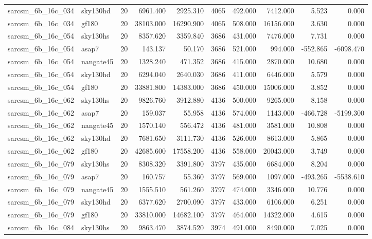 \begin{longtable}{llrrrrrrrr}
sarcsm\_6b\_16c\_034 & sky130hd & 20 & 6961.400 & 2925.310 & 4065 & 492.000 & 7412.000 & 5.523 & 0.000 \\
sarcsm\_6b\_16c\_034 & gf180 & 20 & 38103.000 & 16290.900 & 4065 & 508.000 & 16156.000 & 3.630 & 0.000 \\
sarcsm\_6b\_16c\_054 & sky130hs & 20 & 8357.620 & 3359.840 & 3686 & 431.000 & 7476.000 & 7.731 & 0.000 \\
sarcsm\_6b\_16c\_054 & asap7 & 20 & 143.137 & 50.170 & 3686 & 521.000 & 994.000 & -552.865 & -6098.470 \\
sarcsm\_6b\_16c\_054 & nangate45 & 20 & 1328.240 & 471.352 & 3686 & 415.000 & 2870.000 & 10.680 & 0.000 \\
sarcsm\_6b\_16c\_054 & sky130hd & 20 & 6294.040 & 2640.030 & 3686 & 411.000 & 6446.000 & 5.579 & 0.000 \\
sarcsm\_6b\_16c\_054 & gf180 & 20 & 33881.800 & 14383.000 & 3686 & 450.000 & 15006.000 & 3.852 & 0.000 \\
sarcsm\_6b\_16c\_062 & sky130hs & 20 & 9826.760 & 3912.880 & 4136 & 500.000 & 9265.000 & 8.158 & 0.000 \\
sarcsm\_6b\_16c\_062 & asap7 & 20 & 159.037 & 55.958 & 4136 & 574.000 & 1143.000 & -466.728 & -5199.300 \\
sarcsm\_6b\_16c\_062 & nangate45 & 20 & 1570.140 & 556.472 & 4136 & 481.000 & 3581.000 & 10.808 & 0.000 \\
sarcsm\_6b\_16c\_062 & sky130hd & 20 & 7681.650 & 3111.730 & 4136 & 526.000 & 8613.000 & 5.865 & 0.000 \\
sarcsm\_6b\_16c\_062 & gf180 & 20 & 42685.600 & 17558.200 & 4136 & 558.000 & 20043.000 & 3.749 & 0.000 \\
sarcsm\_6b\_16c\_079 & sky130hs & 20 & 8308.320 & 3391.800 & 3797 & 435.000 & 6684.000 & 8.204 & 0.000 \\
sarcsm\_6b\_16c\_079 & asap7 & 20 & 160.757 & 55.360 & 3797 & 569.000 & 1097.000 & -493.265 & -5538.610 \\
sarcsm\_6b\_16c\_079 & nangate45 & 20 & 1555.510 & 561.260 & 3797 & 474.000 & 3346.000 & 10.776 & 0.000 \\
sarcsm\_6b\_16c\_079 & sky130hd & 20 & 6377.620 & 2700.090 & 3797 & 433.000 & 6106.000 & 6.251 & 0.000 \\
sarcsm\_6b\_16c\_079 & gf180 & 20 & 33810.000 & 14682.100 & 3797 & 464.000 & 14322.000 & 4.615 & 0.000 \\
sarcsm\_6b\_16c\_084 & sky130hs & 20 & 9863.470 & 3874.520 & 3974 & 491.000 & 8490.000 & 7.025 & 0.000 \\

\end{longtable}
